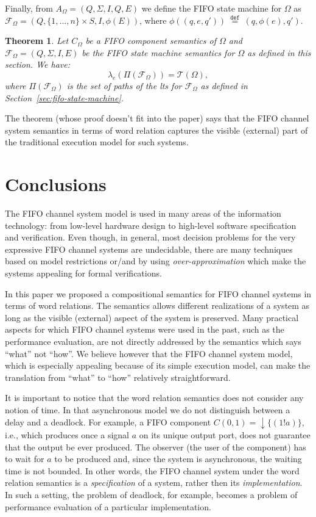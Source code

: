 \documentclass{llncs}
\newtheorem{thm}{Theorem}
\newcommand{\df}[1]{\ \stackrel{\mathtt{def}}{#1}\ }
\begin{document}
Finally, from $A_{\Omega}=(Q,\Sigma,I,Q,E)$ we define the FIFO state
machine for $\Omega$ as $\mathcal{F}_{\Omega}=(Q,\{1,\ldots,n\}\times
S,I,\phi(E))$, where $\phi((q,e,q'))\df{=}(q,\phi(e),q')$.

\begin{thm}
  Let $C_{\Omega}$ be a FIFO component semantics of $\Omega$ and
  $\mathcal{F}_{\Omega}=(Q,\Sigma,I,E)$ be the FIFO state machine
  semantics for $\Omega$ as defined in this section.  We have:
  \[
  \lambda_e(\Pi(\mathcal{F}_{\Omega})) = \mathcal{T}(\Omega),
  \]
  where $\Pi(\mathcal{F}_{\Omega})$ is the set of paths of the
  \emph{lts} for $\mathcal{F}_{\Omega}$ as defined in
  Section~\ref{sec:fifo-state-machine}.
\end{thm}


The theorem (whose proof doesn't fit into the paper) says that
the FIFO channel system semantics in terms of word relation captures
the visible (external) part of the traditional execution model for
such systems.



\section{Conclusions}

The FIFO channel system model is used in many areas of the information
technology: from low-level hardware design to high-level software
specification and verification. Even though, in general, most decision
problems for the very expressive FIFO channel systems are undecidable,
there are many techniques based on model restrictions or/and by
using \emph{over-approximation} which make the systems appealing for
formal verifications.

In this paper we proposed a compositional semantics for FIFO channel
systems in terms of word relations. The semantics allows different
realizations of a system as long as the visible (external) aspect of
the system is preserved. Many practical aspects for which FIFO channel
systems were used in the past, such as the performance evaluation, are
not directly addressed by the semantics which says ``what'' not
``how''.  We believe however that the FIFO channel system model, which
is especially appealing because of its simple execution model, can
make the translation from ``what'' to ``how'' relatively
straightforward.

It is important to notice that the word relation semantics does not
consider any notion of time. In that asynchronous model we do not
distinguish between a delay and a deadlock. For example, a FIFO
component $C(0,1)={\downarrow}\{(1!a)\}$, i.e., which produces once a
signal $a$ on its unique output port, does not guarantee that the
output be ever produced. The observer (the user of the component) has
to wait for $a$ to be produced and, since the system is asynchronous,
the waiting time is not bounded.  In other words, the FIFO channel
system under the word relation semantics is a \emph{specification} of
a system, rather then its \emph{implementation}. In such a setting,
the problem of deadlock, for example, becomes a problem of performance
evaluation of a particular implementation.



\end{document}
